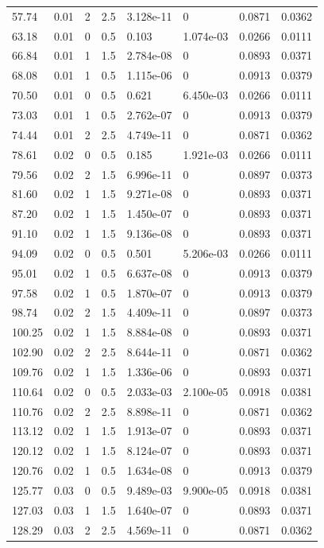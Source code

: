 \documentclass[preview]{standalone}
\begin{document}
{{\begin{tabular}{L{1.2cm}C{1.2cm} C{0.3cm}C{0.5cm} C{1.4cm}C{1.4cm} C{1.4cm}C{1.4cm}}
  57.74  &  0.01  & 2     & 2.5 &  3.128e-11  & 0  & 0.0871 &  0.0362   \\ 
  63.18  &  0.01  & 0     & 0.5 &  0.103  & 1.074e-03  & 0.0266 &  0.0111   \\ 
  66.84  &  0.01  & 1     & 1.5 &  2.784e-08  & 0  & 0.0893 &  0.0371   \\ 
  68.08  &  0.01  & 1     & 0.5 &  1.115e-06  & 0  & 0.0913 &  0.0379   \\ 
  70.50  &  0.01  & 0     & 0.5 &  0.621  & 6.450e-03  & 0.0266 &  0.0111   \\ 
  73.03  &  0.01  & 1     & 0.5 &  2.762e-07  & 0  & 0.0913 &  0.0379   \\ 
  74.44  &  0.01  & 2     & 2.5 &  4.749e-11  & 0  & 0.0871 &  0.0362   \\ 
  78.61  &  0.02  & 0     & 0.5 &  0.185  & 1.921e-03  & 0.0266 &  0.0111   \\ 
  79.56  &  0.02  & 2     & 1.5 &  6.996e-11  & 0  & 0.0897 &  0.0373   \\ 
  81.60  &  0.02  & 1     & 1.5 &  9.271e-08  & 0  & 0.0893 &  0.0371   \\ 
  87.20  &  0.02  & 1     & 1.5 &  1.450e-07  & 0  & 0.0893 &  0.0371   \\ 
  91.10  &  0.02  & 1     & 1.5 &  9.136e-08  & 0  & 0.0893 &  0.0371   \\ 
  94.09  &  0.02  & 0     & 0.5 &  0.501  & 5.206e-03  & 0.0266 &  0.0111   \\ 
  95.01  &  0.02  & 1     & 0.5 &  6.637e-08  & 0  & 0.0913 &  0.0379   \\ 
  97.58  &  0.02  & 1     & 0.5 &  1.870e-07  & 0  & 0.0913 &  0.0379   \\ 
  98.74  &  0.02  & 2     & 1.5 &  4.409e-11  & 0  & 0.0897 &  0.0373   \\ 
  100.25  &  0.02  & 1     & 1.5 &  8.884e-08  & 0  & 0.0893 &  0.0371   \\ 
  102.90  &  0.02  & 2     & 2.5 &  8.644e-11  & 0  & 0.0871 &  0.0362   \\ 
  109.76  &  0.02  & 1     & 1.5 &  1.336e-06  & 0  & 0.0893 &  0.0371   \\ 
  110.64  &  0.02  & 0     & 0.5 &  2.033e-03  & 2.100e-05  & 0.0918 &  0.0381   \\ 
  110.76  &  0.02  & 2     & 2.5 &  8.898e-11  & 0  & 0.0871 &  0.0362   \\ 
  113.12  &  0.02  & 1     & 1.5 &  1.913e-07  & 0  & 0.0893 &  0.0371   \\ 
  120.12  &  0.02  & 1     & 1.5 &  8.124e-07  & 0  & 0.0893 &  0.0371   \\ 
  120.76  &  0.02  & 1     & 0.5 &  1.634e-08  & 0  & 0.0913 &  0.0379   \\ 
  125.77  &  0.03  & 0     & 0.5 &  9.489e-03  & 9.900e-05  & 0.0918 &  0.0381   \\ 
  127.03  &  0.03  & 1     & 1.5 &  1.640e-07  & 0  & 0.0893 &  0.0371   \\ 
  128.29  &  0.03  & 2     & 2.5 &  4.569e-11  & 0  & 0.0871 &  0.0362   \\ 
\hline 
\end{tabular} 

}}
\end{document}
